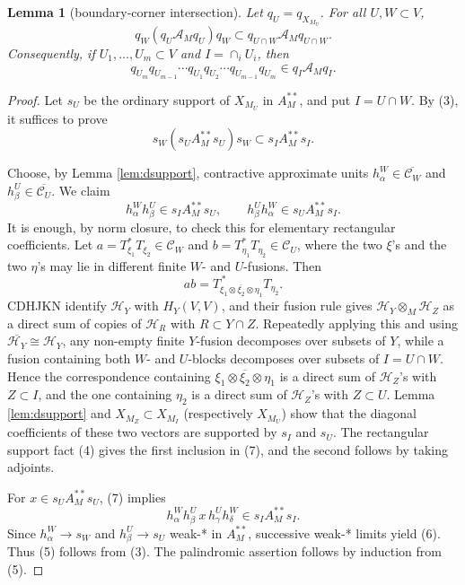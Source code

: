 \documentclass[12pt]{article}
\newtheorem{lemma}{Lemma}
\newcommand{\cA}{\mathcal A}
\newcommand{\cH}{\mathcal H}
\begin{document}
\begin{lemma}[boundary-corner intersection]\label{lem:intersection}
Let \(q_U=q_{X_{M_U}}\).  For all \(U,W\subset V\),
\[
        q_W(q_U\cA_Mq_U)q_W\subset q_{U\cap W}\cA_Mq_{U\cap W}.   \tag{5}
\]
Consequently, if \(U_1,\ldots,U_m\subset V\) and \(I=\cap_iU_i\), then
\[
q_{U_m}q_{U_{m-1}}\cdots q_{U_1}q_{U_2}\cdots q_{U_{m-1}}q_{U_m}
\in q_I\cA_Mq_I .
\]
\end{lemma}

\begin{proof}
Let \(s_U\) be the ordinary support of \(X_{M_U}\) in \(A_M^{**}\), and put
\(I=U\cap W\).  By (3), it suffices to prove
\[
        s_W(s_UA_M^{**}s_U)s_W\subset s_IA_M^{**}s_I.             \tag{6}
\]

Choose, by Lemma \ref{lem:dsupport}, contractive approximate units
\(h_\alpha^W\in\overline{\mathcal C_W}\) and
\(h_\beta^U\in\overline{\mathcal C_U}\).  We claim
\[
        h_\alpha^Wh_\beta^U\in s_IA_M^{**}s_U,\qquad
        h_\beta^Uh_\alpha^W\in s_UA_M^{**}s_I .                  \tag{7}
\]
It is enough, by norm closure, to check this for elementary rectangular
coefficients.  Let \(a=T_{\xi_1}^*T_{\xi_2}\in\mathcal C_W\) and
\(b=T_{\eta_1}^*T_{\eta_2}\in\mathcal C_U\), where the two \(\xi\)'s and the two
\(\eta\)'s may lie in different finite \(W\)- and \(U\)-fusions.  Then
\[
        ab=T_{\xi_1\otimes\overline{\xi_2}\otimes\eta_1}^{\,*}T_{\eta_2}.
                                                                        \tag{8}
\]
CDHJKN identify \(\cH_Y\) with \(H_Y(V,V)\), and their fusion rule
\cite[Theorem 5.4 and Proposition 5.5]{CDHJKN} gives
\(\cH_Y\otimes_M\cH_Z\) as a direct sum of copies of \(\cH_R\) with
\(R\subset Y\cap Z\).  Repeatedly applying this and using
\(\overline{\cH_Y}\cong\cH_Y\), any non-empty finite \(Y\)-fusion decomposes
over subsets of \(Y\), while a fusion containing both \(W\)- and \(U\)-blocks
decomposes over subsets of \(I=U\cap W\).  Hence the correspondence containing
\(\xi_1\otimes\overline{\xi_2}\otimes\eta_1\) is a direct sum of \(\cH_Z\)'s
with \(Z\subset I\), and the one containing \(\eta_2\) is a direct sum of
\(\cH_Z\)'s with \(Z\subset U\).  Lemma \ref{lem:dsupport} and
\(X_{M_Z}\subset X_{M_I}\) (respectively \(X_{M_U}\)) show that the diagonal
coefficients of these two vectors are supported by \(s_I\) and \(s_U\).
The rectangular support fact (4) gives the first inclusion in (7), and the
second follows by taking adjoints.

For \(x\in s_UA_M^{**}s_U\), (7) implies
\[
h_\alpha^Wh_\beta^U\,x\,h_\gamma^Uh_\delta^W\in s_IA_M^{**}s_I .
\]
Since \(h_\alpha^W\to s_W\) and \(h_\beta^U\to s_U\) weak-* in \(A_M^{**}\),
successive weak-* limits yield (6).  Thus (5) follows from (3).  The
palindromic assertion follows by induction from (5).
\end{proof}
\end{document}

